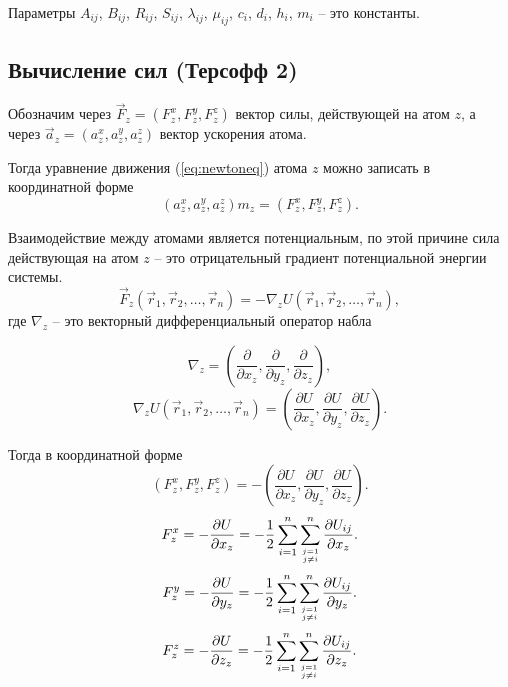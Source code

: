 Параметры $A_{ij}$, $B_{ij}$, $R_{ij}$, $S_{ij}$, $\lambda_{ij}$, $\mu_{ij}$, $c_i$, $d_i$, $h_i$, $m_i$ -- это константы.

\subsection{Вычисление сил (Терсофф 2)}

Обозначим через $\vec{F}_z = (F_{z}^{x}, F_{z}^{y}, F_{z}^{z})$ вектор силы, действующей на атом $z$, а через $\vec{a}_z = (a_{z}^{x}, a_{z}^{y}, a_{z}^{z})$ вектор ускорения атома. 

Тогда уравнение движения (\ref{eq:newtoneq}) атома $z$ можно записать в координатной форме
\begin{equation}
(a_{z}^{x}, a_{z}^{y}, a_{z}^{z}) m_z = (F_{z}^{x}, F_{z}^{y}, F_{z}^{z}).
\end{equation}

Взаимодействие между атомами является потенциальным, по этой причине сила действующая на атом $z$ -- это отрицательный градиент потенциальной энергии системы.
\begin{equation}
\vec{F}_z(\vec{r}_1, \vec{r}_2, \ldots, \vec{r}_n) = - \nabla_z U(\vec{r}_1, \vec{r}_2, \ldots, \vec{r}_n),
\end{equation}
где $\nabla_z$ -- это векторный дифференциальный оператор набла

\begin{equation}
\nabla_z = (\frac{\partial}{\partial x_z}, \frac{\partial}{\partial y_z}, \frac{\partial}{\partial z_z}),
\end{equation}
\begin{equation}
\nabla_z U(\vec{r}_1, \vec{r}_2, \ldots, \vec{r}_n) = (\frac{\partial U}{\partial x_z}, \frac{\partial U}{\partial y_z}, \frac{\partial U}{\partial z_z}).
\end{equation}

Тогда в координатной форме
\begin{equation}
(F_{z}^{x}, F_{z}^{y}, F_{z}^{z}) = - (\frac{\partial U}{\partial x_z}, \frac{\partial U}{\partial y_z}, \frac{\partial U}{\partial z_z}).
\end{equation}
\begin{equation}\label{eq:tersoff2_fx}
F_{z}^{x} = - \frac{\partial U}{\partial x_z} = - \frac{1}{2}\sum_{i = 1}^{n}\sum_{j = 1 \atop j \neq i}^{n} \frac{\partial U_{ij}}{\partial x_z} .
\end{equation}
\begin{equation}\label{eq:tersoff2_fy}
F_{z}^{y} = - \frac{\partial U}{\partial y_z} = - \frac{1}{2}\sum_{i = 1}^{n}\sum_{j = 1 \atop j \neq i}^{n} \frac{\partial U_{ij}}{\partial y_z} .
\end{equation}
\begin{equation}\label{eq:tersoff2_fz}
F_{z}^{z} = - \frac{\partial U}{\partial z_z} = - \frac{1}{2}\sum_{i = 1}^{n}\sum_{j = 1 \atop j \neq i}^{n} \frac{\partial U_{ij}}{\partial z_z} .
\end{equation}

